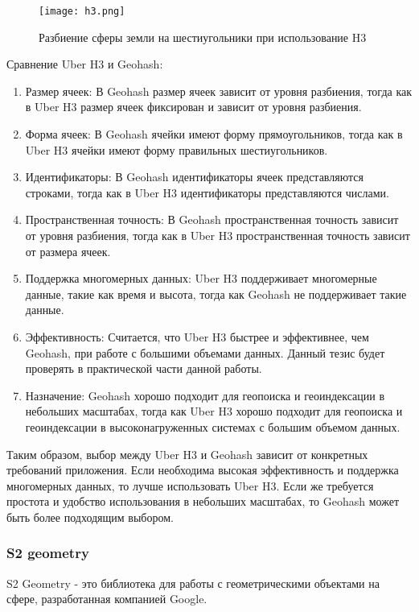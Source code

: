 \begin{figure}[h]
    \centering
    \texttt{[image: h3.png]}
    \caption{Разбиение сферы земли на шестиугольники при использование H3}
\end{figure}

Сравнение Uber H3 и Geohash:
\begin{enumerate}
    \item Размер ячеек: В Geohash размер ячеек зависит от уровня разбиения, тогда как в Uber H3 размер ячеек фиксирован и зависит от уровня разбиения.
    \item Форма ячеек: В Geohash ячейки имеют форму прямоугольников, тогда как в Uber H3 ячейки имеют форму правильных шестиугольников.
    \item Идентификаторы: В Geohash идентификаторы ячеек представляются строками, тогда как в Uber H3 идентификаторы представляются числами.
    \item Пространственная точность: В Geohash пространственная точность зависит от уровня разбиения, тогда как в Uber H3 пространственная точность зависит от размера ячеек.
    \item Поддержка многомерных данных: Uber H3 поддерживает многомерные данные, такие как время и высота, тогда как Geohash не поддерживает такие данные.
    \item Эффективность: Считается, что Uber H3 быстрее и эффективнее, чем Geohash, при работе с большими объемами данных. Данный тезис будет проверять в практической части данной работы.
    \item Назначение: Geohash хорошо подходит для геопоиска и геоиндексации в небольших масштабах, тогда как Uber H3 хорошо подходит для геопоиска и геоиндексации в высоконагруженных системах с большим объемом данных.
\end{enumerate}

Таким образом, выбор между Uber H3 и Geohash зависит от конкретных требований приложения. Если необходима высокая эффективность и поддержка многомерных данных, то лучше использовать Uber H3. Если же требуется простота и удобство использования в небольших масштабах, то Geohash может быть более подходящим выбором.

\subsubsection{S2 geometry}

S2 Geometry - это библиотека для работы с геометрическими объектами на сфере, разработанная компанией Google.

